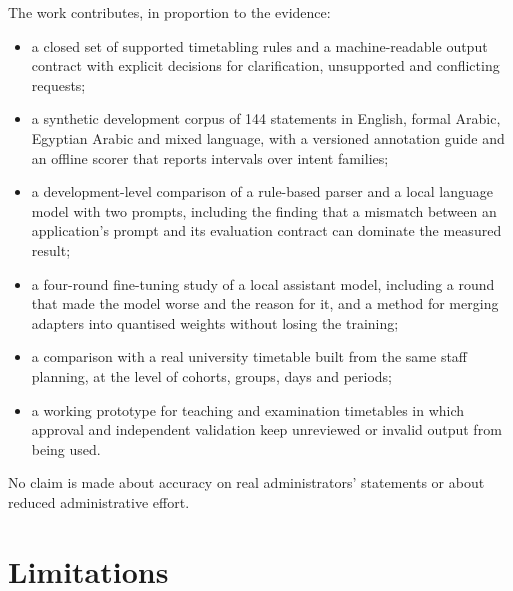 The work contributes, in proportion to the evidence:
\begin{itemize}
\item a closed set of supported timetabling rules and a machine-readable output contract with explicit decisions for clarification, unsupported and conflicting requests;
\item a synthetic development corpus of 144 statements in English, formal Arabic, Egyptian Arabic and mixed language, with a versioned annotation guide and an offline scorer that reports intervals over intent families;
\item a development-level comparison of a rule-based parser and a local language model with two prompts, including the finding that a mismatch between an application's prompt and its evaluation contract can dominate the measured result;
\item a four-round fine-tuning study of a local assistant model, including a round that made the model worse and the reason for it, and a method for merging adapters into quantised weights without losing the training;
\item a comparison with a real university timetable built from the same staff planning, at the level of cohorts, groups, days and periods;
\item a working prototype for teaching and examination timetables in which approval and independent validation keep unreviewed or invalid output from being used.
\end{itemize}
No claim is made about accuracy on real administrators' statements or about reduced administrative effort.

\section{Limitations}

